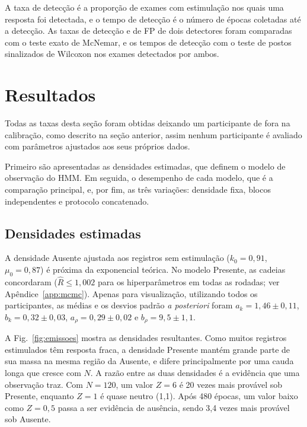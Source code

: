 \documentclass[conference]{IEEEtran}
\begin{document}
A taxa de detecção é a proporção de exames com estimulação nos quais uma resposta foi detectada, e o tempo de detecção é o número de épocas coletadas até a detecção. As taxas de detecção e de FP de dois detectores foram comparadas com o teste exato de McNemar, e os tempos de detecção com o teste de postos sinalizados de Wilcoxon nos exames detectados por ambos.

\section{Resultados}

Todas as taxas desta seção foram obtidas deixando um participante de fora na calibração, como descrito na seção anterior, assim nenhum participante é avaliado com parâmetros ajustados aos seus próprios dados. 

Primeiro são apresentadas as densidades estimadas, que definem o modelo de observação do HMM. Em seguida, o desempenho de cada modelo, que é a comparação principal, e, por fim, as três variações: densidade fixa, blocos independentes e protocolo concatenado.

\subsection{Densidades estimadas}

A densidade Ausente ajustada aos registros sem estimulação ($k_0=0{,}91$, $\mu_0=0{,}87$) é próxima da exponencial teórica. No modelo Presente, as cadeias concordaram ($\hat{R}\le1{,}002$ para os hiperparâmetros em todas as rodadas; ver Apêndice~\ref{app:mcmc}). Apenas para visualização, utilizando todos os participantes, as médias e os desvios padrão \textit{a posteriori} foram $a_k=1{,}46\pm0{,}11$, $b_k=0{,}32\pm0{,}03$, $a_\rho=0{,}29\pm0{,}02$ e $b_\rho=9{,}5\pm1{,}1$.

A Fig.~\ref{fig:emissoes} mostra as densidades resultantes. Como muitos registros estimulados têm resposta fraca, a densidade Presente mantém grande parte de sua massa na mesma região da Ausente, e difere principalmente por uma cauda longa que cresce com $N$. A razão entre as duas densidades é a evidência que uma observação traz. Com $N=120$, um valor $Z=6$ é 20 vezes mais provável sob Presente, enquanto $Z=1$ é quase neutro (1,1). Após 480 épocas, um valor baixo como $Z=0{,}5$ passa a ser evidência de ausência, sendo 3,4 vezes mais provável sob Ausente.
\end{document}
